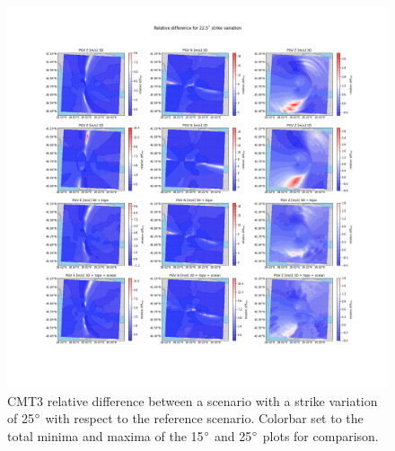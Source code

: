 \documentclass[../Text/00main.tex]{subfiles}
\begin{document}
\begin{figure}[!h]
    \centering
    \includegraphics[width=1.2\linewidth]{images_results/strike_variation_epsilon25_sc3.png}
    \caption{CMT3 relative difference between a scenario with a strike variation of 25$\degree$ with respect to the reference scenario. Colorbar set to the total minima and maxima of the 15$\degree$ and 25$\degree$ plots for comparison.}
    \label{fig:ref_eps25-2}
\end{figure}
\end{document}
